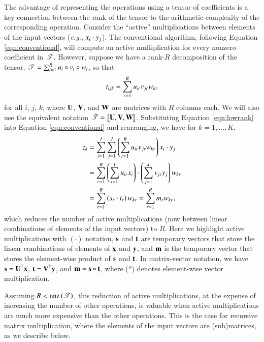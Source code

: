 \documentclass[preprint]{sigplanconf}
\newcommand{\Tra}{{\sf T}}
\newcommand{\V}[2][]{{\bm{#1\mathbf{\MakeLowercase{#2}}}}}
\newcommand{\VE}[3][]{#1{\MakeLowercase{#2}}_{#3}}
\newcommand{\M}[2][]{{\bm{#1\mathbf{\MakeUppercase{#2}}}}}
\newcommand{\ME}[3][]{#1{\MakeLowercase{#2}}_{#3}}
\newcommand{\T}[2][]{\boldsymbol{#1\mathscr{\MakeUppercase{#2}}}}
\newcommand{\TE}[3][]{#1{\MakeLowercase{#2}}_{#3}}
\newcommand{\Oprod}{\circ}
\newcommand{\Hada}{\ast}
\begin{document}
The advantage of representing the operations using a tensor of coefficients is a key connection between the rank of the tensor to the arithmetic complexity of the corresponding operation.
Consider the ``active'' multiplications between elements of the input vectors (\emph{e.g.}, $\VE{x}{i} \cdot \VE{y}{j}$).
The conventional algorithm, following Equation \eqref{eqn:conventional}, will compute an active multiplication for every nonzero coefficient in $\T{T}$.
However, suppose we have a rank-$R$ decomposition of the tensor, $\T{T} = \sum_{i=1}^{R} u_i \Oprod v_i \Oprod w_i$, so that
\begin{equation}
\label{eqn:lowrank}
\TE{T}{ijk} = \sum_{r=1}^R \ME{u}{ir} \ME{v}{jr} \ME{w}{kr}
\end{equation}
for all $i$, $j$, $k$, where $\M{U}$, $\M{V}$, and $\M{W}$ are matrices with $R$ columns each.
We will also use the equivalent notation $\T{T}=\alg{\M{U}}{\M{V}}{\M{W}}$.
Substituting Equation \eqref{eqn:lowrank} into Equation \eqref{eqn:conventional} and rearranging, we have for $k=1,\dots,K$,
\begin{align*}
\VE{z}{k} &= \sum_{i=1}^I\sum_{j=1}^J \lt(\sum_{r=1}^R \ME{u}{ir} \ME{v}{jr} \ME{w}{kr}\rt) \VE{x}{i} \cdot \VE{y}{j} \\
& = \sum_{r=1}^R \lt(\sum_{i=1}^I \ME{u}{ir}\VE{x}{i}\rt) \cdot \lt(\sum_{j=1}^J \ME{v}{jr}\VE{y}{j}\rt) \ME{w}{kr} \\
& = \sum_{r=1}^R \lt(\VE{s}{r} \cdot \VE{t}{r} \rt) \ME{w}{kr} = \sum_{r=1}^R \VE{m}{r} \ME{w}{kr},
\end{align*}
which reduces the number of active multiplications (now between linear combinations of elements of the input vectors) to $R$.
Here we highlight active multiplications with $(\cdot)$ notation, $\V{s}$ and $\V{t}$ are temporary vectors that store the linear combinations of elements of $\V{x}$ and $\V{y}$, and $\V{m}$ is the temporary vector that stores the element-wise product of $\V{s}$ and $\V{t}$.  
In matrix-vector notation, we have $\V{s}=\M{U}^{\Tra}  \V{x}$, $\V{t}=\M{V}^{\Tra}  \V{y}$, and $\V{m}=\V{s} \Hada \V{t}$, where ($\Hada$) denotes element-wise vector multiplication.

Assuming $R<\nnz{\T{T}}$, this reduction of active multiplications, at the expense of increasing the number of other operations, is valuable when active multiplications are much more expensive than the other operations.
This is the case for recursive matrix multiplication, where the elements of the input vectors are (sub)matrices, as we describe below.
\end{document}
